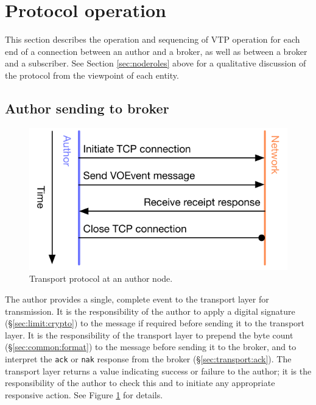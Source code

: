 \documentclass[a4paper,11pt]{ivoa}
\begin{document}
\section{Protocol operation}

This section describes the operation and sequencing of VTP operation for each
end of a connection between an author and a broker, as well as between a
broker and a subscriber. See Section \ref{sec:noderoles} above for a
qualitative discussion of the protocol from the viewpoint of each entity.

\subsection{Author sending to broker}
\label{sec:protocol:authortobroker}

\begin{figure}[H]
  \begin{center}
  \includegraphics{figures/authortobroker.pdf}
  \end{center}

  \caption{Transport protocol at an author node.}

  \label{fig:protocol:authortobroker}
\end{figure}


The author provides a single, complete event to the transport layer for
transmission. It is the responsibility of the author to apply a digital
signature (\S\ref{sec:limit:crypto}) to the message if required before sending
it to the transport layer. It is the responsibility of the transport layer to
prepend the byte count (\S\ref{sec:common:format}) to the message before
sending it to the broker, and to interpret the \texttt{ack} or \texttt{nak}
response from the broker (\S\ref{sec:transport:ack}).  The transport layer
returns a value indicating success or failure to the author; it is the
responsibility of the author to check this and to initiate any appropriate
responsive action. See Figure \ref{fig:protocol:authortobroker} for details.
\end{document}
